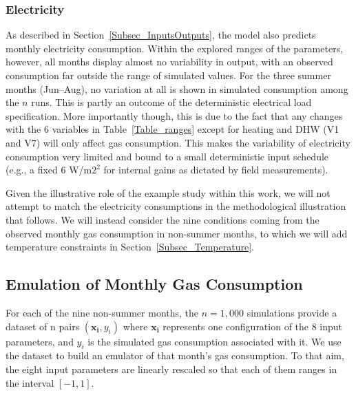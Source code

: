 \documentclass[preprint,12pt, sort&compress]{elsarticle}
\newcommand{\bd}[1]{\boldsymbol{#1}}
\newcommand{\x}[1][]{\bd{x_{#1}}}
\begin{document}
\subsubsection{Electricity}

As described in Section~\ref{Subsec_InputsOutputs}, the model also predicts monthly electricity consumption. Within the explored ranges of the parameters, however, all months display almost no variability in output, with an observed consumption far outside the range of simulated values. For the three summer months (Jun--Aug), no variation at all is shown in simulated consumption among the $n$ runs. This is partly an outcome of the deterministic electrical load specification. More importantly though, this is due to the fact that any changes with the 6 variables in Table~\ref{Table_ranges} except for heating and DHW (V1 and V7) will only affect gas consumption. This makes the variability of electricity consumption very limited and bound to a small deterministic input schedule (e.g., a fixed 6 W/m$2^2$ for internal gains as dictated by field measurements). 

Given the illustrative role of the example study within this work, we will not attempt to match the electricity consumptions in the methodological illustration that follows. We will instead consider the nine conditions coming from the observed monthly gas consumption in non-summer months, to which we will add temperature constraints in Section~\ref{Subsec_Temperature}. 


\subsection{Emulation of Monthly Gas Consumption}

For each of the nine non-summer months, the $n=1,000$ simulations provide a dataset of n pairs $(\x[i], y_i)$ where $\x[i]$ represents one configuration of the 8 input parameters, and $y_i$ is the simulated gas consumption associated with it. We use the dataset to build an emulator of that month’s gas consumption. To that aim, the eight input parameters are linearly rescaled so that each of them ranges in the interval $[-1,1]$.
 
\end{document}
